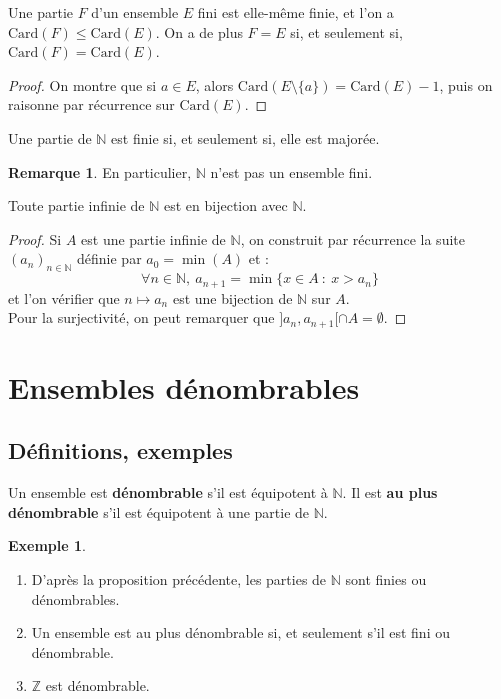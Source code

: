 \documentclass[french]{article}
\newcommand{\N}{\mathbb{N}}
\newcommand{\Z}{\mathbb{Z}}
\newcommand{\card}{\text{Card}}
\theoremstyle{plain}
\theoremstyle{definition}
\newtheorem*{ex}{Exemple}
\newtheorem*{rmq}{Remarque}
\theoremstyle{remark}
\begin{document}
\begin{prop}%
	Une partie $F$ d'un ensemble $E$ fini est elle-même finie, et l'on a $\card(F)\leqslant\card(E)$. On a de plus $F=E$ si, et seulement si, $\card(F)=\card(E)$.
\end{prop}
\begin{proof}
	On montre que si $a\in E$, alors $\card(E\setminus\{a\})=\card(E)-1$, puis on raisonne par récurrence sur $\card(E)$.
\end{proof}

\begin{prop}%
	Une partie de $\N$ est finie si, et seulement si, elle est majorée.
\end{prop}

\begin{rmq}
	En particulier, $\N$ n'est pas un ensemble fini.
\end{rmq}

\begin{prop}%
	Toute partie infinie de $\N$ est en bijection avec $\N$.
\end{prop}
\begin{proof}
	Si $A$ est une partie infinie de $\N$, on construit par récurrence la suite $(a_n)_{n\in\N}$ définie par $a_0=\min(A)$ et : $$\forall n\in\N,\ a_{n+1}=\min\{x\in A\ : \ x>a_n\}$$ et l'on vérifier que $n\mapsto a_n$ est une bijection de $\N$ sur $A$. \\
	Pour la surjectivité, on peut remarquer que $]a_{n},a_{n+1}[\cap A=\emptyset$.
\end{proof}

\section{Ensembles dénombrables}

\subsection{Définitions, exemples}

\begin{dfn}
	Un ensemble est \textbf{dénombrable} s'il est équipotent à $\N$. Il est \textbf{au plus dénombrable} s'il est équipotent à une partie de $\N$.
\end{dfn}

\begin{ex}
	\begin{enumerate}
		\item D'après la proposition précédente, les parties de $\N$ sont finies ou dénombrables.
		\item Un ensemble est au plus dénombrable si, et seulement s'il est fini ou dénombrable.
		\item $\Z$ est dénombrable.
	\end{enumerate}
\end{ex}
\end{document}
